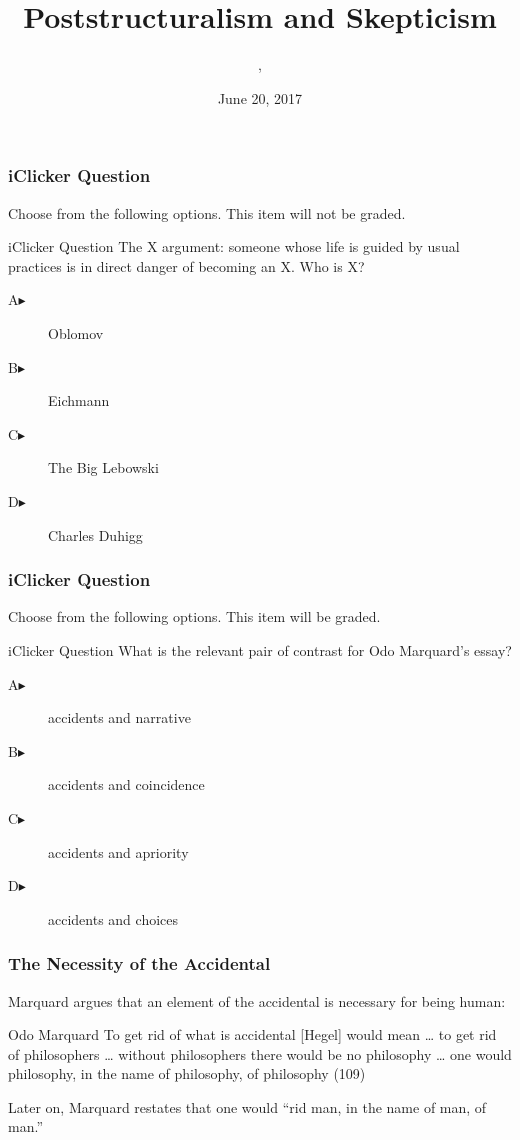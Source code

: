 \documentclass[xcolor=dvipsnames]{beamer}
\title{Poststructuralism and Skepticism}
\subtitle{{\CourseNumber}, {\CourseInst}}
\author{\CourseName}
\date{June 20, 2017}
\begin{document}
\begin{frame}
  \titlepage
\end{frame}

\begin{frame}
  \frametitle{iClicker Question}
Choose from the following options. This item will not be graded.
\begin{block}{iClicker Question}
The X argument: someone whose life is guided by usual practices is in
direct danger of becoming an X. Who is X?
\end{block}
\begin{description}
\item[A\hspace{.2in}$\blacktriangleright$] Oblomov
\item[B\hspace{.2in}$\blacktriangleright$] Eichmann
\item[C\hspace{.2in}$\blacktriangleright$] The Big Lebowski
\item[D\hspace{.2in}$\blacktriangleright$] Charles Duhigg
\end{description}
\end{frame}

\begin{frame}
  \frametitle{iClicker Question}
Choose from the following options. This item will be graded.
\begin{block}{iClicker Question}
What is the relevant pair of contrast for Odo Marquard's essay?
\end{block}
\begin{description}
\item[A\hspace{.2in}$\blacktriangleright$] accidents and narrative
\item[B\hspace{.2in}$\blacktriangleright$] accidents and coincidence
\item[C\hspace{.2in}$\blacktriangleright$] accidents and apriority
\item[D\hspace{.2in}$\blacktriangleright$] accidents and choices
\end{description}
\end{frame}

\begin{frame}
  \frametitle{The Necessity of the Accidental}
  Marquard argues that an element of the accidental is necessary for
  being human: 
  \begin{block}{Odo Marquard}
    To get rid of what is accidental [Hegel] would mean {\ldots} to
    get rid of philosophers {\ldots} without philosophers there would
    be no philosophy {\ldots} one would philosophy, in the name of
    philosophy, of philosophy (109)
  \end{block}
Later on, Marquard restates that one would ``rid man, in the name of
man, of man.''
\end{frame}
\end{document}
